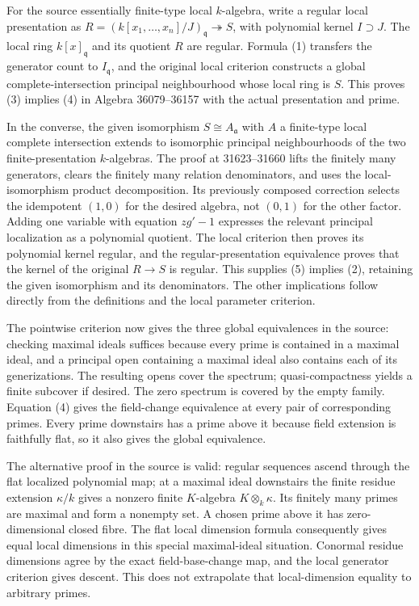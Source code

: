 For the source essentially finite-type local \(k\)-algebra, write a regular local presentation as \(R=(k[x_1,\ldots,x_n]/J)_{\mathfrak q}\twoheadrightarrow S\), with polynomial kernel \(I\supset J\). The local ring \(k[x]_{\mathfrak q}\) and its quotient \(R\) are regular. Formula (1) transfers the generator count to \(I_{\mathfrak q}\), and the original local criterion constructs a global complete-intersection principal neighbourhood whose local ring is \(S\). This proves (3) implies (4) in Algebra 36079--36157 with the actual presentation and prime.

In the converse, the given isomorphism \(S\cong A_{\mathfrak a}\) with \(A\) a finite-type local complete intersection extends to isomorphic principal neighbourhoods of the two finite-presentation \(k\)-algebras. The proof at 31623--31660 lifts the finitely many generators, clears the finitely many relation denominators, and uses the local-isomorphism product decomposition. Its previously composed correction selects the idempotent \((1,0)\) for the desired algebra, not \((0,1)\) for the other factor. Adding one variable with equation \(zg'-1\) expresses the relevant principal localization as a polynomial quotient. The local criterion then proves its polynomial kernel regular, and the regular-presentation equivalence proves that the kernel of the original \(R\to S\) is regular. This supplies (5) implies (2), retaining the given isomorphism and its denominators. The other implications follow directly from the definitions and the local parameter criterion.

The pointwise criterion now gives the three global equivalences in the source: checking maximal ideals suffices because every prime is contained in a maximal ideal, and a principal open containing a maximal ideal also contains each of its generizations. The resulting opens cover the spectrum; quasi-compactness yields a finite subcover if desired. The zero spectrum is covered by the empty family. Equation (4) gives the field-change equivalence at every pair of corresponding primes. Every prime downstairs has a prime above it because field extension is faithfully flat, so it also gives the global equivalence.

The alternative proof in the source is valid: regular sequences ascend through the flat localized polynomial map; at a maximal ideal downstairs the finite residue extension \(\kappa/k\) gives a nonzero finite \(K\)-algebra \(K\otimes_k\kappa\). Its finitely many primes are maximal and form a nonempty set. A chosen prime above it has zero-dimensional closed fibre. The flat local dimension formula consequently gives equal local dimensions in this special maximal-ideal situation. Conormal residue dimensions agree by the exact field-base-change map, and the local generator criterion gives descent. This does not extrapolate that local-dimension equality to arbitrary primes.

